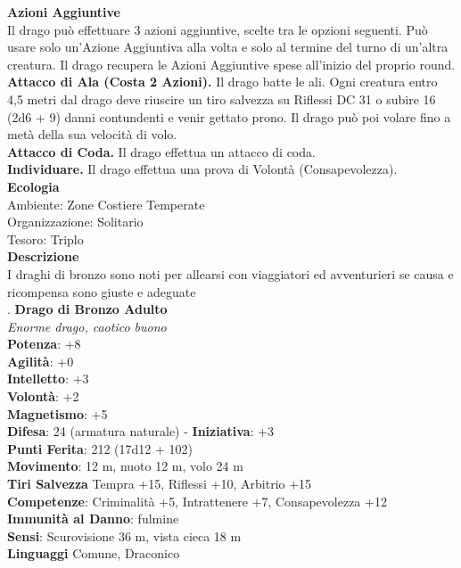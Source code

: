 \begin{multicols}{2}
\textbf{Azioni Aggiuntive}\\
Il drago può effettuare 3 azioni aggiuntive, scelte tra le opzioni seguenti. Può usare solo un'Azione Aggiuntiva alla volta e solo al termine del turno di un'altra creatura. Il drago recupera le Azioni Aggiuntive spese all'inizio del proprio round.\\
\textbf{Attacco di Ala (Costa 2 Azioni).} Il drago batte le ali. Ogni creatura entro 4,5 metri dal drago deve riuscire un tiro salvezza su Riflessi DC  31 o subire 16 (2d6 + 9) danni contundenti e venir gettato prono. Il drago può poi volare fino a metà della sua velocità di volo.\\
\textbf{Attacco di Coda.} Il drago effettua un attacco di coda.\\
\textbf{Individuare.} Il drago effettua una prova di Volontà (Consapevolezza).\\
\textbf{Ecologia}\\
Ambiente: Zone Costiere Temperate\\
Organizzazione: Solitario\\
Tesoro: Triplo\\
\textbf{Descrizione}\\
I draghi di bronzo sono noti per allearsi con viaggiatori ed avventurieri se causa e ricompensa sono giuste e adeguate\\
.
\medskip\textbf{Drago di Bronzo Adulto}\\
\emph{Enorme drago, caotico buono}\\
\textbf{Potenza}: +8\\
\textbf{Agilità}: +0\\
\textbf{Intelletto}: +3\\
\textbf{Volontà}: +2\\
\textbf{Magnetismo}: +5\\
\textbf{Difesa}: 24 (armatura naturale) - \textbf{Iniziativa}: +3\\
\textbf{Punti Ferita}: 212 (17d12 + 102)\\
\textbf{Movimento}: 12 m, nuoto 12 m, volo 24 m\\
\textbf{Tiri Salvezza} Tempra +15, Riflessi +10, Arbitrio +15\\
\textbf{Competenze}: Criminalità +5, Intrattenere +7, Consapevolezza +12\\
\textbf{Immunità al Danno}: fulmine\\
\textbf{Sensi}: Scurovisione 36 m, vista cieca 18 m\\
\textbf{Linguaggi} Comune, Draconico\\

\end{multicols}

